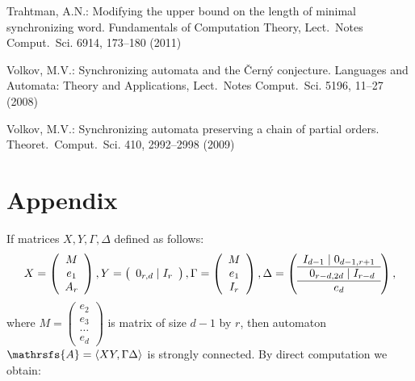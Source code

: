 \documentclass[11pt]{llncs}
\newcommand{\A}{\mathrsfs{A}}
\newcommand{\G}{\Gamma}
\newcommand{\D}{\Delta}
\begin{document}
\begin{thebibliography}{99}
Trahtman, A.N.: Modifying the upper bound on the length of minimal synchronizing word. Fundamentals of Computation Theory, Lect.\ Notes
Comput.\ Sci. 6914, 173--180 (2011)

Volkov, M.V.: Synchronizing automata and the \v{C}ern\'{y}
conjecture.
Languages and Automata: Theory and Applications, Lect.\ Notes
Comput.\ Sci. 5196, 11--27 (2008)

Volkov, M.V.: Synchronizing automata preserving a chain of partial
orders. Theoret.\ Comput.\ Sci. 410, 2992--2998 (2009)
\end{thebibliography}

\section*{Appendix}
If matrices $X,Y,\G,\D$ defined as follows:
$$
X =
\left(
\begin{array}{c}
M \\
e_1 \\
A_r
\end{array}
\right),
Y =
\left(
\begin{array}{c}
0_{r,d} \mid I_r
\end{array}
\right),
\G =
\left(
\begin{array}{c}
M \\
e_1 \\
I_r
\end{array}
\right),
\D =
\left(
\begin{array}{c}
I_{d - 1} \mid 0_{d-1,r + 1} \\ \hline
\textbf{\,\,\,} 0_{r-d,2d} \mid I_{r - d} \\ \hline
e_d
\end{array}
\right),
$$
where $M =
\left(
\begin{smallmatrix}
e_2\\
e_3\\
\ldots\\
e_d
\end{smallmatrix}\right)$ is matrix of size $d - 1$ by $r$,
then automaton $\A = \langle XY, \G\D\rangle$ is strongly connected. By direct computation we obtain:
\end{document}
